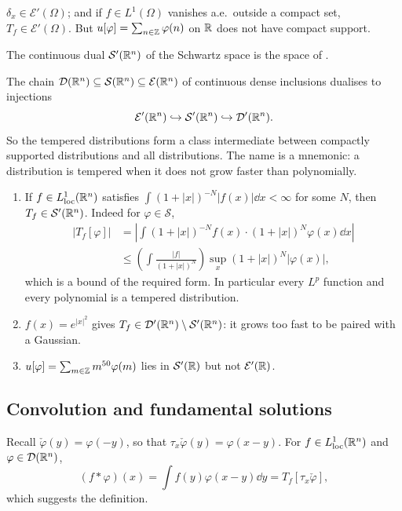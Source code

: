 \documentclass[a4paper]{scrartcl}
\newcommand{\Sch}{\mathcal{S}}
\newcommand{\Ecal}{\mathcal{E}}
\begin{document}
\begin{example}
	$\delta_x \in \Ecal'(\Omega)$; and if $f \in L^1(\Omega)$ vanishes a.e.\ outside a compact set, $T_f\in\Ecal'(\Omega)$. But $u[\varphi]=\sum_{n\in\mathbb{Z}}\varphi(n)$ on $\mathbb{R}$ does not have compact support.
\end{example}

\begin{definition}
	The continuous dual $\Sch'(\R^n)$ of the Schwartz space is the space of .
\end{definition}

The chain $\DD(\R^n)\subseteq\Sch(\R^n)\subseteq\Ecal(\R^n)$ of continuous dense inclusions dualises to injections
$$\Ecal'(\R^n)\hookrightarrow\Sch'(\R^n)\hookrightarrow\DD'(\R^n).$$
So the tempered distributions form a class intermediate between compactly supported distributions and all distributions. The name is a mnemonic: a distribution is tempered when it does not grow faster than polynomially.

\begin{example}
	\begin{enumerate}[label=(\roman*)]
		\item If $f\in L^1_{\mathrm{loc}}(\mathbb{R}^n)$ satisfies $\int(1+|x|)^{-N}|f(x)|\dd x<\infty$ for some $N$, then $T_f\in\Sch'(\R^n)$. Indeed for $\varphi\in\Sch$,
		\begin{align*}
			|T_f[\varphi]| &=\left|\int(1+|x|)^{-N}f(x)\cdot(1+|x|)^N\varphi(x)\dd x\right| \\
			&\le\left(\int\frac{|f|}{(1+|x|)^N}\right)\sup_x(1+|x|)^N|\varphi(x)|,
		\end{align*}
		which is a bound of the required form. In particular every $L^p$ function and every polynomial is a tempered distribution.
		\item $f(x)=e^{|x|^2}$ gives $T_f\in\DD'(\R^n)\setminus\Sch'(\R^n)$: it grows too fast to be paired with a Gaussian.
		\item $u[\varphi]=\sum_{m\in\mathbb{Z}}m^{50}\varphi(m)$ lies in $\Sch'(\R)$ but not $\Ecal'(\R)$.
	\end{enumerate}
\end{example}

\subsection{Convolution and fundamental solutions}

Recall $\check\varphi(y)=\varphi(-y)$, so that $\tau_x\check\varphi(y)=\varphi(x-y)$. For $f \in L^1_{\mathrm{loc}}(\mathbb{R}^n)$ and $\varphi\in\mathcal{D}(\mathbb{R}^n)$,
$$(f*\varphi)(x)=\int f(y)\varphi(x-y)\dd y = T_f[\tau_x\check\varphi],$$
which suggests the definition.
\end{document}
